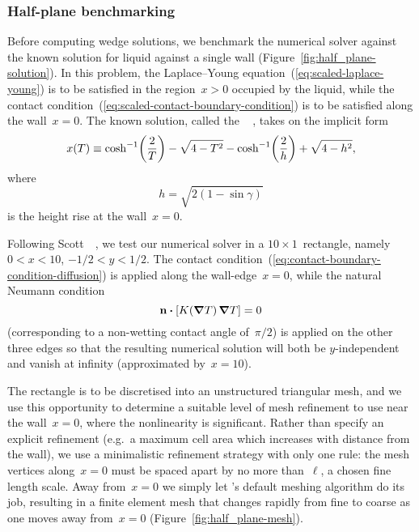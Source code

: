 \subsubsection{Half-plane benchmarking}
\label{sec:moderate.nonlinear.numerical.half-plane}

Before computing wedge solutions,
we benchmark the numerical solver
against the known solution
for liquid against a single wall
(Figure~\ref{fig:half_plane-solution}).
In this problem,
the Laplace--Young equation~(\ref{eq:scaled-laplace-young})
is to be satisfied in the region~$x > 0$ occupied by the liquid,
while the contact condition~(\ref{eq:scaled-contact-boundary-condition})
is to be satisfied along the wall~$x = 0$.
The known solution,
called the ~%
  \cite{anderson-2006-exact-solutions-laplace-young},
takes on the implicit form
\begin{equation}
  x (T) \ideq
    \cosh^{-1} \roundbr*{\frac{2}{T}} - \sqrt{4 - T^2}
    - \cosh^{-1} \roundbr*{\frac{2}{h}} + \sqrt{4 - h^2},
  \label{eq:half-plane-solution}
\end{equation}
where
\begin{equation}
  h = \sqrt{2 (1 - \sin\gamma)}
  \label{eq:half-plane-height}
\end{equation}
is the height rise at the wall~$x = 0$.

\begin{figure}
\end{figure}

Following Scott~\etal~\cite{scott-2005-computation-capillary-laplace-young},
we test our numerical solver in a $10 \times 1$~rectangle,
namely $0 < x < 10$, $-1/2 < y < 1/2$.
The contact condition~(\ref{eq:contact-boundary-condition-diffusion})
is applied along the wall-edge~$x = 0$,
while the natural Neumann condition
\begin{equation}
  \normalvec \dotp \squarebr[\bulkysize]{K (\del T) \del T} = 0
  \label{eq:natural-boundary-condition-diffusion}
\end{equation}
(corresponding to a non-wetting contact angle of~$\pi/2$)
is applied on the other three edges
so that the resulting numerical solution will both be $y$-independent
and vanish at infinity (approximated by~$x = 10$).

The rectangle is to be discretised into an unstructured triangular mesh,
and we use this opportunity to determine
a suitable level of mesh refinement to use
near the wall~$x = 0$, where the nonlinearity is significant.
Rather than specify an explicit refinement
(e.g.~a maximum cell area which increases with distance from the wall),
we use a minimalistic refinement strategy with only one rule:
the mesh vertices along~$x = 0$ must be spaced apart
by no more than~$\ell$, a chosen fine length scale.
Away from~$x = 0$ we simply let 's
default meshing algorithm do its job,
resulting in a finite element mesh
that changes rapidly from fine to coarse
as one moves away from~$x = 0$
(Figure~\ref{fig:half_plane-mesh}).

